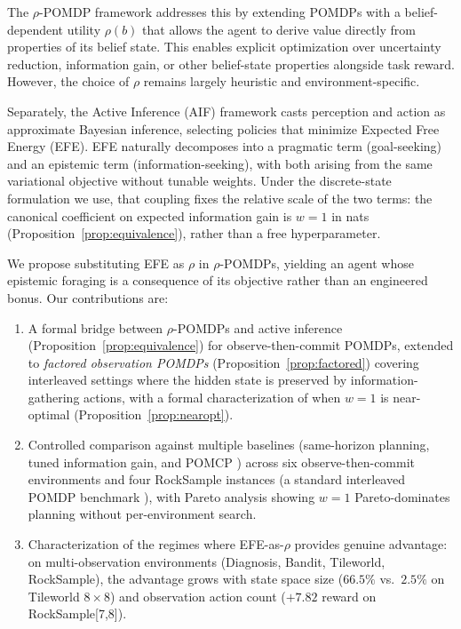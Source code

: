 \documentclass{article}
\begin{document}
The $\rho$-POMDP framework \citep{araya2010} addresses this by extending POMDPs with a belief-dependent utility $\rho(b)$ that allows the agent to derive value directly from properties of its belief state. This enables explicit optimization over uncertainty reduction, information gain, or other belief-state properties alongside task reward. However, the choice of $\rho$ remains largely heuristic and environment-specific.

Separately, the Active Inference (AIF) framework \citep{friston2010, parr2019} casts perception and action as approximate Bayesian inference, selecting policies that minimize Expected Free Energy (EFE). EFE naturally decomposes into a pragmatic term (goal-seeking) and an epistemic term (information-seeking), with both arising from the same variational objective without tunable weights. Under the discrete-state formulation we use, that coupling fixes the relative scale of the two terms: the canonical coefficient on expected information gain is $w{=}1$ in nats (Proposition~\ref{prop:equivalence}), rather than a free hyperparameter.

We propose substituting EFE as $\rho$ in $\rho$-POMDPs, yielding an agent whose epistemic foraging is a consequence of its objective rather than an engineered bonus. Our contributions are:
\begin{enumerate}
    \item A formal bridge between $\rho$-POMDPs and active inference (Proposition~\ref{prop:equivalence}) for observe-then-commit POMDPs, extended to \emph{factored observation POMDPs} (Proposition~\ref{prop:factored}) covering interleaved settings where the hidden state is preserved by information-gathering actions, with a formal characterization of when $w{=}1$ is near-optimal (Proposition~\ref{prop:nearopt}).
    \item Controlled comparison against multiple baselines (same-horizon planning, tuned information gain, and POMCP \citep{silver2010}) across six observe-then-commit environments and four RockSample instances (a standard interleaved POMDP benchmark \citep{smith2004}), with Pareto analysis showing $w{=}1$ Pareto-dominates planning without per-environment search.
    \item Characterization of the regimes where EFE-as-$\rho$ provides genuine advantage: on multi-observation environments (Diagnosis, Bandit, Tileworld, RockSample), the advantage grows with state space size ($66.5\%$ vs.\ $2.5\%$ on Tileworld $8{\times}8$) and observation action count ($+7.82$ reward on RockSample[7,8]).
\end{enumerate}
\end{document}
